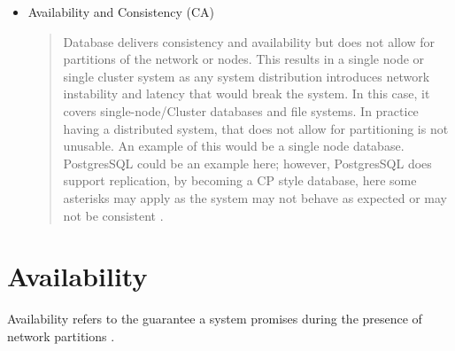 \documentclass[a4paper,10pt,titlepage]{report}
\begin{document}
\begin{itemize}
    \item Availability and Consistency (CA) \\ 
    \begin{quote}
    Database delivers consistency and availability but does not allow for partitions of the network or nodes. This results in a single node or single cluster system as any system distribution introduces network instability and latency that would break the system. In this case, it covers single-node/Cluster databases and file systems. In practice having a distributed system, that does not allow for partitioning is not unusable. An example of this would be a single node database. PostgresSQL could be an example here; however, PostgresSQL does support replication, by becoming a CP style database, here some asterisks may apply as the system may not behave as expected or may not be consistent \cite{aphyrpostgres}. 
    \end{quote}
\end{itemize}

\section{Availability}

Availability refers to the guarantee a system promises during the presence of network partitions \cite{HighlyAvailableTransactionsVirtuesandLimitations}.
\end{document}
